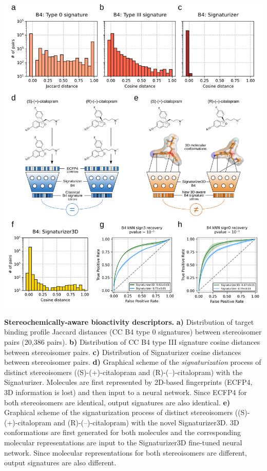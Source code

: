 \begin{Figure_modified}
  \centering
  \includegraphics[width=1\linewidth]{figures/Stereoisomers/Main/Fig2_v4.png}
  \caption{
    \textbf{Stereochemically-aware bioactivity descriptors.}
    \textbf{a)} Distribution of target binding profile Jaccard distances (CC B4 type 0 signatures) between stereoisomer pairs (20,386 pairs).
    \textbf{b)} Distribution of CC B4 type III signature cosine distances between stereoisomer pairs.
    \textbf{c)} Distribution of Signaturizer cosine distances between stereoisomer pairs.
    \textbf{d)} Graphical scheme of the \textit{signaturization} process of distinct stereoisomers ((S)-(+)-citalopram and (R)-(–)-citalopram) with the Signaturizer. Molecules are first represented by 2D-based fingerprints (ECFP4, 3D information is lost) and then input to a neural network. Since ECFP4 for both stereoisomers are identical, output signatures are also identical.
     \textbf{e)} Graphical scheme of the signaturization process of distinct stereoisomers ((S)-(+)-citalopram and (R)-(–)-citalopram) with the novel Signaturizer3D. 3D conformations are first generated for both molecules and the corresponding molecular representations are input to the Signaturizer3D fine-tuned neural network. Since molecular representations for both stereoisomers are different, output signatures are also different.
}
\end{Figure_modified}

